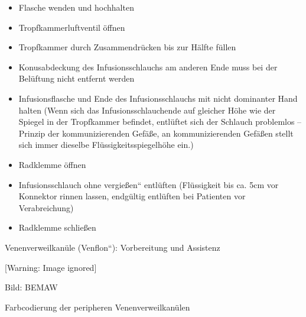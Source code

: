 \documentclass{article}
\begin{document}
\begin{itemize}
\item Flasche wenden und hochhalten

\item Tropfkammerluftventil \"offnen

\item Tropfkammer durch Zusammendr\"ucken bis zur H\"alfte f\"ullen

\item Konusabdeckung des Infusionsschlauchs am anderen Ende muss bei der
Bel\"uftung nicht entfernt werden

\item Infusionsflasche und Ende des Infusionsschlauchs mit nicht
dominanter Hand halten  (Wenn sich das Infusionsschlauchende auf
gleicher H\"ohe wie der Spiegel in der Tropfkammer befindet,
entl\"uftet sich der Schlauch problemlos --  Prinzip der
kommunizierenden Gef\"a{\ss}e, an kommunizierenden Gef\"a{\ss}en stellt
sich immer dieselbe Fl\"ussigkeitsspiegelh\"ohe ein.)

\item Radklemme \"offnen

\item Infusionsschlauch {\quotedblbase}ohne
vergie{\ss}en{\textquotedblleft} entl\"uften %
%
(Fl\"ussigkeit bis ca. 5cm vor Konnektor rinnen lassen, endg\"ultig
entl\"uften bei Patienten vor Verabreichung)

\item Radklemme schlie{\ss}en

\end{itemize}
Venenverweilkan\"ule ({\quotedblbase}Venflon{\textquotedblleft}):
Vorbereitung und Assistenz 

  [Warning: Image ignored] %
 

Bild: BEMAW

Farbcodierung der peripheren Venenverweilkan\"ulen
\end{document}
